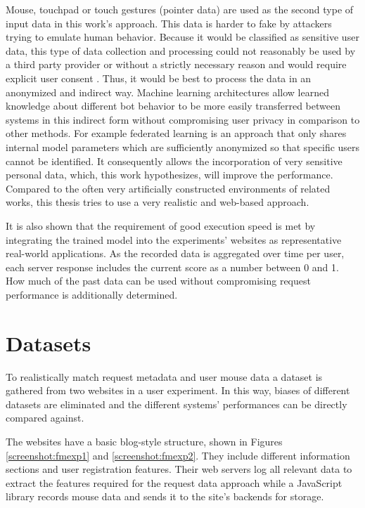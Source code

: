 \documentclass[
    fontsize=12pt,
    headings=small,
    parskip=half,           %
    bibliography=totoc,
    numbers=noenddot,       %
    open=any,               %
    final,                   %
    table
]{scrreprt}
\begin{document}
Mouse, touchpad or touch gestures (pointer data) are used as the second type of input data in this work's approach. This data is harder to fake by attackers trying to emulate human behavior. Because it would be classified as sensitive user data, this type of data collection and processing could not reasonably be used by a third party provider or without a strictly necessary reason and would require explicit user consent \cite{GDPR}. Thus, it would be best to process the data in an anonymized and indirect way. Machine learning architectures allow learned knowledge about different bot behavior to be more easily transferred between systems in this indirect form without compromising user privacy in comparison to other methods. For example federated learning \cite{DBLP:journals/corr/KonecnyMR15} \cite{DBLP:journals/corr/KonecnyMRR16} is an approach that only shares internal model parameters which are sufficiently anonymized so that specific users cannot be identified. It consequently allows the incorporation of very sensitive personal data, which, this work hypothesizes, will improve the performance. Compared to the often very artificially constructed environments of related works, this thesis tries to use a very realistic and web-based approach.

It is also shown that the requirement of good execution speed is met by integrating the trained model into the experiments' websites as representative real-world applications. As the recorded data is aggregated over time per user, each server response includes the current score as a number between 0 and 1. How much of the past data can be used without compromising request performance is additionally determined.

\section{Datasets}

To realistically match request metadata and user mouse data a dataset is gathered from two websites in a user experiment. In this way, biases of different datasets are eliminated and the different systems' performances can be directly compared against.

The websites have a basic blog-style structure, shown in Figures \ref{screenshot:fmexp1} and \ref{screenshot:fmexp2}. They include different information sections and user registration features. Their web servers log all relevant data to extract the features required for the request data approach while a JavaScript library records mouse data and sends it to the site's backends for storage.
\end{document}
